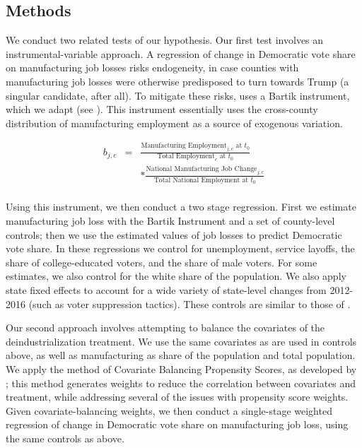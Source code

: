 \documentclass[]{AEA}
\begin{document}
\subsection{Methods} 
\label{methodssec}

We conduct two related tests of our hypothesis. Our first test involves
an instrumental-variable approach. A regression of change in Democratic
vote share on manufacturing job losses risks endogeneity, in case
counties with manufacturing job losses were otherwise predisposed to
turn towards Trump (a singular candidate, after all). To mitigate these
risks, \cite{Baccini21} uses a Bartik instrument, which we adapt (see
\cite{Bartik91}). This instrument essentially uses the cross-county
distribution of manufacturing employment as a source of exogenous
variation.

\[
\begin{aligned}
b_{j,c} &=& \frac{\text{Manufacturing Employment}_{j,c} \text{ at } t_0}{\text{Total Employment}_c \text{ at }t_0}  \\
&&  * \frac{\text{National Manufacturing Job Change}_{j,c} }{\text{Total National Employment at }t_0} \\
\end{aligned}
\]

Using this instrument, we then conduct a two stage regression. First we
estimate manufacturing job loss with the Bartik Instrument and a set of
county-level controls; then we use the estimated values of job losses to
predict Democratic vote share. In these regressions we control for
unemployment, service layoffs, the share of college-educated voters, and
the share of male voters. For some estimates, we also control for the
white share of the population. We also apply state fixed effects to
account for a wide variety of state-level changes from 2012-2016 (such
as voter suppression tactics). These controls are similar to those of
\cite{Baccini21}.

Our second approach involves attempting to balance the covariates of the
deindustrialization treatment. We use the same covariates as are used in
controls above, as well as manufacturing as share of the population and
total population. We apply the method of Covariate Balancing Propensity
Scores, as developed by \cite{Imai14}; this method generates weights to
reduce the correlation between covariates and treatment, while
addressing several of the issues with propensity score weights. Given
covariate-balancing weights, we then conduct a single-stage weighted
regression of change in Democratic vote share on manufacturing job loss,
using the same controls as above.
\end{document}
